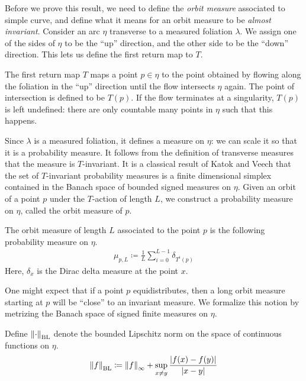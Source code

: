 Before we prove this result, we need to define the \emph{orbit measure} associated to simple curve, and define what it means for an orbit measure to be \emph{almost invariant}.
Consider an arc $\eta$ transverse to a measured foliation $\lambda$.
We assign one of the sides of $\eta$ to be the ``up'' direction, and the other side to be the ``down'' direction.
This lets us define the first return map to $T$.
\begin{definition}
  The first return map $T$ maps a point $p \in \eta$ to the point obtained by flowing along the foliation in the ``up'' direction until the flow intersects $\eta$ again.
  The point of intersection is defined to be $T(p)$.
  If the flow terminates at a singularity, $T(p)$ is left undefined: there are only countable many points in $\eta$ such that this happens.
\end{definition}
Since $\lambda$ is a measured foliation, it defines a measure on $\eta$: we can scale it so that it is a probability measure.
It follows from the definition of transverse measures that the measure is $T$-invariant.
It is a classical result of Katok \cite{zbMATH03467479}  and Veech \cite{Veech1978} that the set of $T$-invariant probability measures is a finite dimensional simplex contained in the Banach space of bounded signed measures on $\eta$.
Given an orbit of a point $p$ under the $T$-action of length $L$, we construct a probability measure on $\eta$, called the orbit measure of $p$.
\begin{definition}
  The orbit measure of length $L$ associated to the point $p$ is the following probability measure on $\eta$.
  \begin{align*}
    \mu_{p, L} \coloneqq \frac{1}{L} \sum_{i=0}^{L-1} \delta_{T^i(p)}
  \end{align*}
  Here, $\delta_{x}$ is the Dirac delta measure at the point $x$.
\end{definition}
One might expect that if a point $p$ equidistributes, then a long orbit measure starting at $p$ will be ``close'' to an invariant measure.
We formalize this notion by metrizing the Banach space of signed finite measures on $\eta$.
\begin{definition}
  Define $\left\lVert\cdot\right\rVert_{\mathrm{BL}}$ denote the bounded Lipschitz norm on the space of continuous functions on $\eta$.
  \begin{align*}
    \left\lVert f\right\rVert_{\mathrm{BL}} \coloneqq \left\lVert f\right\rVert_{\infty} + \sup_{x \neq y} \frac{\left| f(x) - f(y) \right|}{\left| x - y \right|}
  \end{align*}
\end{definition}
